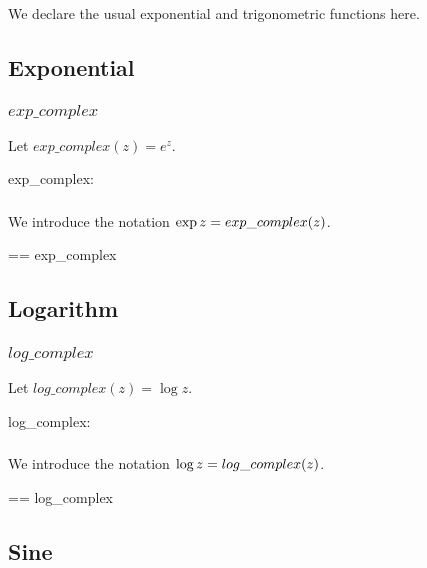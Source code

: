 \documentclass[11pt, oneside]{article}
\begin{document}
We declare the usual exponential and trigonometric functions here.

\subsection{Exponential}

\subsubsection{$exp\_complex$}

Let $exp\_complex(z) = e^z$.

\begin{axdef}
	exp\_complex: \C \fun \C
\end{axdef}

\subsubsection{}

We introduce the notation $\operatorname{exp} z = exp\_complex(z)$.

\begin{zed}
	\expC == exp\_complex
\end{zed}

\subsection{Logarithm}

\subsubsection{$log\_complex$}

Let $log\_complex(z) = \log z$.

\begin{axdef}
	log\_complex: \Cnz \fun \C
\end{axdef}

\subsubsection{}

We introduce the notation $\operatorname{log} z = log\_complex(z)$.

\begin{zed}
	\logC == log\_complex
\end{zed}

\subsection{Sine}
\end{document}

